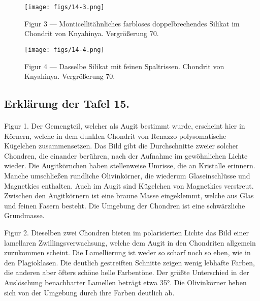 \documentclass[a4paper, 11pt, oneside, polutonikogreek, german]{article}
\begin{document}
\vspace*{\fill}
\begin{figure}[H]
\centering
\texttt{[image: figs/14-3.png]}
\caption{\small Figur 3 --- Monticellitähnliches farbloses doppelbrechendes Silikat im Chondrit von Knyahinya. Vergrößerung 70.}
\end{figure}
\vspace*{\fill}
\clearpage

\vspace*{\fill}
\begin{figure}[H]
\centering
\texttt{[image: figs/14-4.png]}
\caption{\small Figur 4 --- Dasselbe Silikat mit feinen Spaltrissen. Chondrit von Knyahinya. Vergrößerung 70.}
\end{figure}
\vspace*{\fill}
\clearpage

\subsection{Erklärung der Tafel 15.}
\paragraph{}
Figur 1. Der Gemengteil, welcher als Augit bestimmt wurde, erscheint hier in Körnern, welche in dem dunklen Chondrit von Renazzo polysomatische Kügelchen zusammensetzen. Das Bild gibt die Durchschnitte zweier solcher Chondren, die einander berühren, nach der Aufnahme im gewöhnlichen Lichte wieder. Die Augitkörnchen haben stellenweise Umrisse, die an Kristalle erinnern. Manche umschließen rundliche Olivinkörner, die wiederum Glaseinschlüsse und Magnetkies enthalten. Auch im Augit sind Kügelchen von Magnetkies verstreut. Zwischen den Augitkörnern ist eine braune Masse eingeklemmt, welche aus Glas und feinen Fasern besteht. Die Umgebung der Chondren ist eine schwärzliche Grundmasse.

Figur 2. Dieselben zwei Chondren bieten im polarisierten Lichte das Bild einer lamellaren Zwillingsverwachsung, welche dem Augit in den Chondriten allgemein zuzukommen scheint. Die Lamellierung ist weder so scharf noch so eben, wie in den Plagioklasen. Die deutlich gestreiften Schnitte zeigen wenig lebhafte Farben, die anderen aber öfters schöne helle Farbentöne. Der größte Unterschied in der Auslöschung benachbarter Lamellen beträgt etwa 35°. Die Olivinkörner heben sich von der Umgebung durch ihre Farben deutlich ab.
\end{document}
